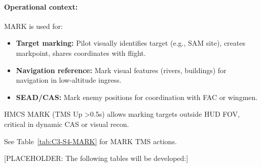 \documentclass[11pt, a4paper, twoside]{report}
\newenvironment{hotastable}[1]{%
	\small
	\setlength{\tabcolsep}{2pt}
	\renewcommand{\arraystretch}{1.25}
	\begin{longtable}{L{1.00cm} L{0.90cm} L{0.90cm} L{3.30cm} L{6.40cm} L{1.40cm} L{2.10cm}}
		\caption{#1}\\
		\rowcolor{headerblue}
		\multicolumn{1}{>{\centering\arraybackslash}p{1.00cm}}{\textbf{\color{white}Mode}} &
		\multicolumn{1}{>{\centering\arraybackslash}p{0.90cm}}{\textbf{\color{white}Dir.}} &
		\multicolumn{1}{>{\centering\arraybackslash}p{0.90cm}}{\textbf{\color{white}Act.}} &
		\multicolumn{1}{>{\centering\arraybackslash}p{3.30cm}}{\textbf{\color{white}Function}} &
		\multicolumn{1}{>{\centering\arraybackslash}p{6.40cm}}{\textbf{\color{white}Effect / Nuance}} &
		\multicolumn{1}{>{\centering\arraybackslash}p{1.40cm}}{\textbf{\color{white}Dash34}} &
		\multicolumn{1}{>{\centering\arraybackslash}p{2.10cm}}{\textbf{\color{white}Train.}} \\
		\endfirsthead
		\rowcolor{headerblue}
		\multicolumn{1}{>{\centering\arraybackslash}p{1.00cm}}{\textbf{\color{white}Mode}} &
		\multicolumn{1}{>{\centering\arraybackslash}p{0.90cm}}{\textbf{\color{white}Dir.}} &
		\multicolumn{1}{>{\centering\arraybackslash}p{0.90cm}}{\textbf{\color{white}Act.}} &
		\multicolumn{1}{>{\centering\arraybackslash}p{3.30cm}}{\textbf{\color{white}Function}} &
		\multicolumn{1}{>{\centering\arraybackslash}p{6.40cm}}{\textbf{\color{white}Effect / Nuance}} &
		\multicolumn{1}{>{\centering\arraybackslash}p{1.40cm}}{\textbf{\color{white}Dash34}} &
		\multicolumn{1}{>{\centering\arraybackslash}p{2.10cm}}{\textbf{\color{white}Train.}} \\
		\endhead
		\multicolumn{7}{r}{\small\emph{Continued on next page}}\\
		\endfoot
		\endlastfoot
	}{%
	\end{longtable}
}
\begin{document}
\paragraph{Operational context:}
MARK is used for:
\begin{itemize}
    \item \textbf{Target marking:} Pilot visually identifies target (e.g., SAM site), creates markpoint, shares coordinates with flight.
    \item \textbf{Navigation reference:} Mark visual features (rivers, buildings) for navigation in low-altitude ingress.
    \item \textbf{SEAD/CAS:} Mark enemy positions for coordination with FAC or wingmen.
\end{itemize}

HMCS MARK (TMS Up >0.5s) allows marking targets outside HUD FOV, critical in dynamic CAS or visual recon.

See Table~\ref{tab:C3-S4-MARK} for MARK TMS actions.


[PLACEHOLDER: The following tables will be developed:]


\end{document}
